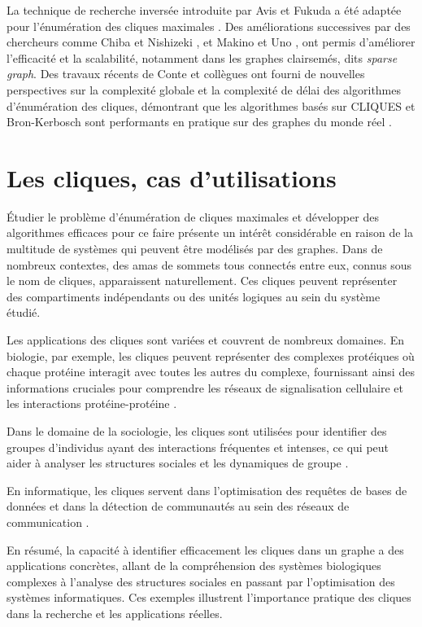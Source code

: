 \documentclass[12pt,a4paper]{article}
\begin{document}
La technique de recherche inversée introduite par Avis et Fukuda a été adaptée pour l'énumération des cliques maximales \cite{avis1996reverse}. Des améliorations successives par des chercheurs comme Chiba et Nishizeki \cite{chiba1985arboricity}, et Makino et Uno \cite{makino2004new}, ont permis d'améliorer l'efficacité et la scalabilité, notamment dans les graphes clairsemés, dits \emph{sparse graph}. Des travaux récents de Conte et collègues ont fourni de nouvelles perspectives sur la complexité globale et la complexité de délai des algorithmes d'énumération des cliques, démontrant que les algorithmes basés sur CLIQUES et Bron-Kerbosch sont performants en pratique sur des graphes du monde réel \cite{conte2022overall}.

\section{Les cliques, cas d'utilisations}%
\label{sec:usecase}

Étudier le problème d'énumération de cliques maximales et développer des algorithmes efficaces pour ce faire présente un intérêt considérable en raison de la multitude de systèmes qui peuvent être modélisés par des graphes. Dans de nombreux contextes, des amas de sommets tous connectés entre eux, connus sous le nom de cliques, apparaissent naturellement. Ces cliques peuvent représenter des compartiments indépendants ou des unités logiques au sein du système étudié.

Les applications des cliques sont variées et couvrent de nombreux domaines. En biologie, par exemple, les cliques peuvent représenter des complexes protéiques où chaque protéine interagit avec toutes les autres du complexe, fournissant ainsi des informations cruciales pour comprendre les réseaux de signalisation cellulaire et les interactions protéine-protéine \cite{PAVLOU2016305}.

Dans le domaine de la sociologie, les cliques sont utilisées pour identifier des groupes d'individus ayant des interactions fréquentes et intenses, ce qui peut aider à analyser les structures sociales et les dynamiques de groupe \cite{SCOTT201129}.

En informatique, les cliques servent dans l'optimisation des requêtes de bases de données et dans la détection de communautés au sein des réseaux de communication \cite{CORMEN200932}.

En résumé, la capacité à identifier efficacement les cliques dans un graphe a des applications concrètes, allant de la compréhension des systèmes biologiques complexes à l'analyse des structures sociales en passant par l'optimisation des systèmes informatiques. Ces exemples illustrent l'importance pratique des cliques dans la recherche et les applications réelles\cite{FORTUNATO201075}.
\end{document}
